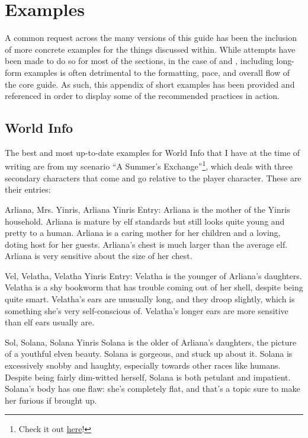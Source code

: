 \documentclass[Coomer-main.tex]{subfiles}
\begin{document}
\appendix
{}
\chapter{Examples}
\label{ch:app}

A common request across the many versions of this guide has been the inclusion of more concrete examples for the things discussed within. While attempts have been made to do so for most of the sections, in the case of \wi and \rem, including long-form examples is often detrimental to the formatting, pace, and overall flow of the core guide. As such, this appendix of short examples has been provided and referenced in order to display some of the recommended practices in action.

\section{World Info}

The best and most up-to-date examples for World Info that I have at the time of writing are from my scenario “A Summer’s Exchange”\footnote{Check it out \href{https://play.aidungeon.io/main/scenarioView?publicId=c2cf5da0-390d-11eb-ae47-b9ecf242a75d}{here}!}, which deals with three secondary characters that come and go relative to the player character. These are their \wi entries:

\begin{WI}{Arliana, Mrs. Yinris, Arliana Yinris}
Entry: Arliana is the mother of the Yinris household. Arliana is mature by elf standards but still looks quite young and pretty to a human. Arliana is a caring mother for her children and a loving, doting host for her guests. Arliana’s chest is much larger than the average elf. Arliana is very sensitive about the size of her chest.
\end{WI}

\begin{WI}{Vel, Velatha, Velatha Yinris}
Entry: Velatha is the younger of Arliana's daughters. Velatha is a shy bookworm that has trouble coming out of her shell, despite being quite smart. Velatha's ears are unusually long, and they droop slightly, which is something she's very self-conscious of. Velatha's longer ears are more sensitive than elf ears usually are.
\end{WI}

\begin{WI}{Sol, Solana, Solana Yinris}
Solana is the older of Arliana's daughters, the picture of a youthful elven beauty. Solana is gorgeous, and stuck up about it. Solana is excessively snobby and haughty, especially towards other races like humans. Despite being fairly dim-witted herself, Solana is both petulant and impatient. Solana's body has one flaw: she's completely flat, and that's a topic sure to make her furious if brought up.
\end{WI}
\end{document}
